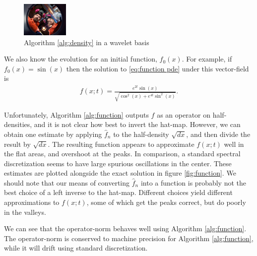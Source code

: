 \documentclass[12pt]{amsart}
\begin{document}
\begin{figure}[h]
	\centering
	\includegraphics[width=0.2\textwidth]{./images/placeholder}
	\caption{Algorithm \ref{alg:density} in a wavelet basis}
\end{figure}


We also know the evolution for an initial function, $f_{0}(x)$.
For example, if $f_{0}(x) = \sin(x)$ then the solution to \eqref{eq:function pde} under this vector-field is
\begin{align}
	f(x;t) = \frac{ e^{2t} \sin(x) }{ \sqrt{ \cos^{2}(x) + e^{4t} \sin^{2}(x) } }.
\end{align}

Unfortunately, Algorithm \ref{alg:function} outputs $f$ as an operator on half-densities, and it is not clear how best to invert the hat-map.
However, we can obtain one estimate by applying $\hat{f}_{n}$ to the half-density $\sqrt{dx}$, and then divide the result by $\sqrt{dx}$.
The resulting function appears to approximate $f(x;t)$ well in the flat areas, and overshoot at the peaks.
In comparison, a standard spectral discretization seems to have large spurious oscillations in the center.
These estimates are plotted alongside the exact solution in figure \ref{fig:function}.
We should note that our means of converting $\hat{f}_{n}$ into a function is probably not the best choice of a left inverse to the hat-map.
Different choices yield different approximations to $f(x;t)$, some
of which get the peaks correct, but do poorly in the valleys.

We can see that the operator-norm behaves well using Algorithm \ref{alg:function}.
The operator-norm is conserved to machine precision for Algorithm \ref{alg:function}, while it will drift using standard discretization.
\end{document}
